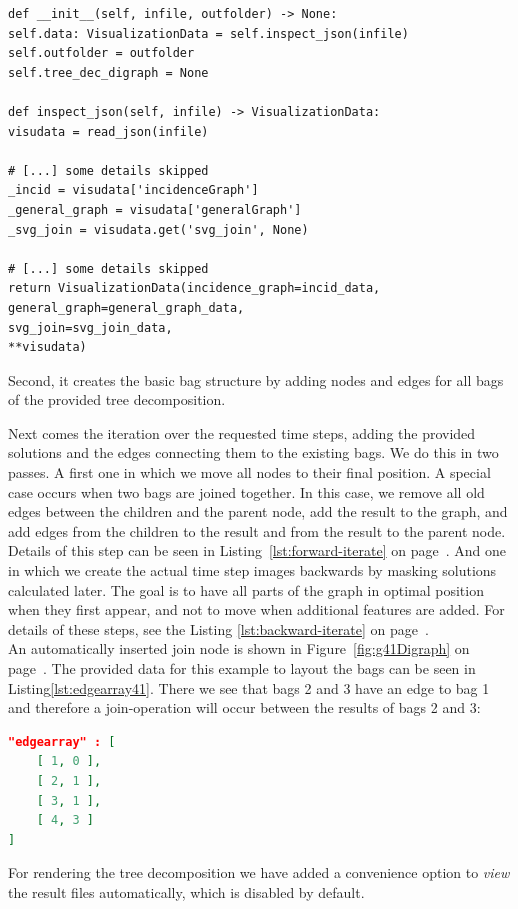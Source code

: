 \documentclass[a4paper, 12pt, bibliography=totoc]{scrartcl}
\begin{document}
\begin{lstlisting}[style=custompy, caption={Overview of data initialization}, label={lst:visuinitsmall}]
def __init__(self, infile, outfolder) -> None:
self.data: VisualizationData = self.inspect_json(infile)
self.outfolder = outfolder
self.tree_dec_digraph = None

def inspect_json(self, infile) -> VisualizationData:
visudata = read_json(infile)

# [...] some details skipped
_incid = visudata['incidenceGraph']
_general_graph = visudata['generalGraph']
_svg_join = visudata.get('svg_join', None)

# [...] some details skipped		
return VisualizationData(incidence_graph=incid_data,
general_graph=general_graph_data,
svg_join=svg_join_data,
**visudata)
\end{lstlisting}

Second, it creates the basic bag structure by adding nodes and edges for all bags of the provided tree decomposition.

Next comes the iteration over the requested time steps, adding the provided solutions and the edges connecting them to the existing bags. We do this in two passes.  A first one in which we move all nodes to their final position. A special case occurs when two bags are joined together.
In this case, we remove all old edges between the children and the parent node, add the result to the graph, and add edges from the children to the result and from the result to the parent node. Details of this step can be seen in Listing~\ref{lst:forward-iterate} on page~\pageref{lst:forward-iterate}. And one in which we create the actual time step images backwards by masking solutions calculated later. The goal is to have all parts of the graph in optimal position when they first appear, and not to move when additional features are added. For details of these steps, see the Listing \ref{lst:backward-iterate} on page~\pageref{lst:backward-iterate}.\\

An automatically inserted join node is shown in Figure~\ref{fig:g41Digraph} on page~\pageref{fig:g41Digraph}.
The provided data for this example to layout the bags can be seen in Listing\ref{lst:edgearray41}. There we see that bags 2 and 3 have an edge to bag 1 and therefore a join-operation will occur between the results of bags 2 and 3:

\begin{lstlisting}[language=json,caption={Structure provided for bags of example \ref{fig:g41Digraph} },xleftmargin=5.5cm,xrightmargin=5.8cm,label={lst:edgearray41}]
"edgearray" : [
	[ 1, 0 ],
	[ 2, 1 ],
	[ 3, 1 ],
	[ 4, 3 ]
]
\end{lstlisting}
\noindent
For rendering the tree decomposition we have added a convenience option to \textit{view} the result files automatically, which is disabled by default.
\end{document}
